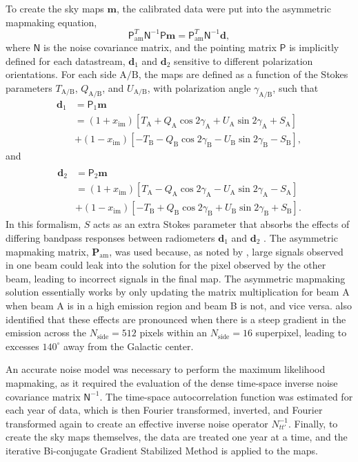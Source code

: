 \documentclass[twocolumn]{../../common/aa}
\newcommand{\A}[0]{\mathrm{A}}
\newcommand{\B}[0]{\mathrm{B}}
\begin{document}
To create the sky maps $\boldsymbol m$, the calibrated data were put into the asymmetric mapmaking equation,
\begin{equation}
	\mathsf P_\mathrm{am}^T\mathsf N^{-1}\mathsf P\boldsymbol m=\mathsf P^T_\mathrm{am}\mathsf N^{-1}\boldsymbol d,
\end{equation}
where $\mathsf N$ is the noise covariance matrix, and the pointing matrix $\mathsf P$ is implicitly defined for each datastream, $\boldsymbol d_1$ and $\boldsymbol d_2$ sensitive to different polarization orientations. For each side $\A/\B$, the maps are defined as a function of the Stokes parameters $T_{\A/\B}$, $Q_{\A/\B}$, and $U_{\A/\B}$, with polarization angle $\gamma_{\A/\B}$, such that
\begin{align}
	\boldsymbol d_1&=\mathsf P_1\boldsymbol m
	\nonumber
	\\
	&=(1+x_\mathrm{im})[T_\A+Q_\A\cos2\gamma_\A+U_\A\sin2\gamma_\A+S_\A]
	\nonumber
	\\
	&+(1-x_\mathrm{im})[-T_\B-Q_\B\cos2\gamma_\B-U_\B\sin2\gamma_\B-S_\B],
\end{align}
and
\begin{align}
	\\
	\boldsymbol d_2&=\mathsf P_2\boldsymbol m
	\nonumber
	\\
	&=(1+x_\mathrm{im})[T_\A-Q_\A\cos2\gamma_\A-U_\A\sin2\gamma_\A-S_\A]
	\nonumber
	\\
	&+(1-x_\mathrm{im})[-T_\B+Q_\B\cos2\gamma_\B+U_\B\sin2\gamma_\B+S_\B].
\end{align}
In this formalism, $S$ acts as an extra Stokes parameter that absorbs the effects of differing bandpass responses between radiometers $\boldsymbol d_1$ and $\boldsymbol d_2$ \citep{jarosik2007}.
The asymmetric mapmaking matrix, $\boldsymbol P_\mathrm{am}$, was used because, as noted by \citet{jarosik2010}, large signals observed in one beam could leak into the solution for the pixel observed by the other beam, leading to incorrect signals in the final map. The asymmetric mapmaking solution essentially works by only updating the matrix multiplication for beam A when beam A is in a high emission region and beam B is not, and vice versa. \citet{bennett2012} also identified that these effects are pronounced when there is a steep gradient in the emission across the $N_\mathrm{side}=512$ pixels within an $N_\mathrm{side}=16$ superpixel, leading to excesses $140^\circ$ away from the Galactic center.

An accurate noise model was necessary to perform the maximum likelihood mapmaking, as it required the evaluation of the dense time-space inverse noise covariance matrix  $\mathsf N^{-1}$. The time-space autocorrelation function was estimated for each year of data, which is then Fourier transformed, inverted, and Fourier transformed again to create an effective inverse noise operator $N_{tt'}^{-1}$. 
Finally, to create the sky maps themselves, the data are treated one year at a time, and the iterative Bi-conjugate Gradient Stabilized Method \citep[BiCG-STAB][]{bicgstab,bicgstab_template} is applied to the maps.
\end{document}
